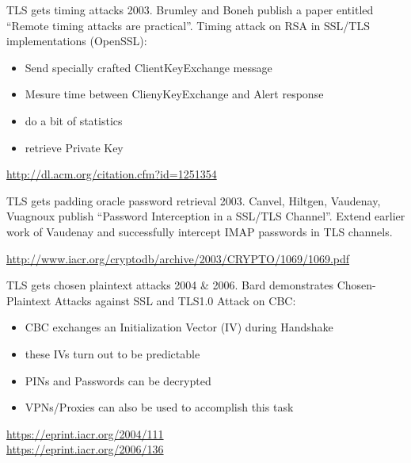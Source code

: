 \begin{frame}{TLS gets timing attacks}
  2003. Brumley and Boneh publish a paper entitled ``Remote timing attacks are practical''.
  \newline
  \newline
  Timing attack on RSA in SSL/TLS implementations (OpenSSL):
  \begin{itemize}
    \item Send specially crafted ClientKeyExchange message
    \item Mesure time between ClienyKeyExchange and Alert response
    \item do a bit of statistics
    \item retrieve Private Key
  \end{itemize}

  \vspace{50px}

  \tiny\url{http://dl.acm.org/citation.cfm?id=1251354}
\end{frame}

\begin{frame}{TLS gets padding oracle password retrieval}
  2003. Canvel, Hiltgen, Vaudenay, Vuagnoux publish ``Password Interception in a SSL/TLS Channel''.
  \newline
  \newline
  Extend earlier work of Vaudenay and successfully intercept IMAP passwords in TLS channels.

  \vspace{95px}

  \tiny\url{http://www.iacr.org/cryptodb/archive/2003/CRYPTO/1069/1069.pdf}
\end{frame}

\begin{frame}{TLS gets chosen plaintext attacks}
  2004 \& 2006. Bard demonstrates Chosen-Plaintext Attacks against SSL and TLS1.0
  \newline
  \newline
  Attack on CBC:
  \begin{itemize}
    \item CBC exchanges an Initialization Vector (IV) during Handshake
    \item these IVs turn out to be predictable
    \item PINs and Passwords can be decrypted
    \item VPNs/Proxies can also be used to accomplish this task
  \end{itemize}
  
  \vspace{50px}

  \tiny
  \url{https://eprint.iacr.org/2004/111}\\
  \url{https://eprint.iacr.org/2006/136}
\end{frame}

